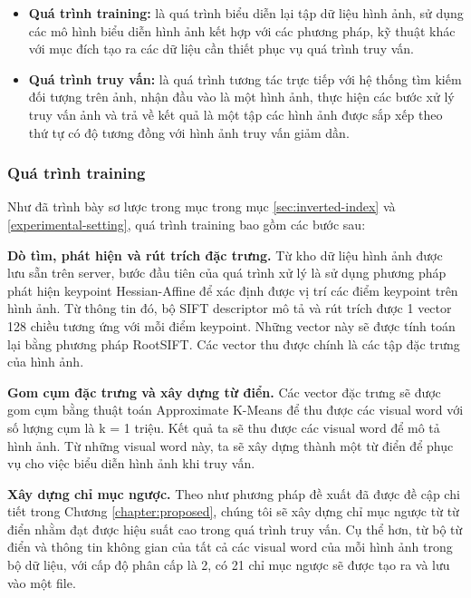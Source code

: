 \begin{itemize}
\item \textbf{Quá trình training:} là quá trình biểu diễn lại tập dữ liệu hình ảnh, sử dụng các mô hình biểu diễn hình ảnh kết hợp với các phương pháp, kỹ thuật khác với mục đích tạo ra các dữ liệu cần thiết phục vụ quá trình truy vấn.

\item \textbf{Quá trình truy vấn:} là quá trình tương tác trực tiếp với hệ thống tìm kiếm đối tượng trên ảnh, nhận đầu vào là một hình ảnh, thực hiện các bước xử lý truy vấn ảnh và trả về kết quả là một tập các hình ảnh được sắp xếp theo thứ tự có độ tương đồng với hình ảnh truy vấn giảm dần.
\end{itemize}

\subsubsection{Quá trình training}
Như đã trình bày sơ lược trong mục trong mục \ref{sec:inverted-index} và \ref{experimental-setting}, quá trình training bao gồm các bước sau:

\textbf{Dò tìm, phát hiện và rút trích đặc trưng.} Từ kho dữ liệu hình ảnh được lưu sẵn trên server, bước đầu tiên của quá trình xử lý là sử dụng phương pháp phát hiện keypoint Hessian-Affine để xác định được vị trí các điểm keypoint trên hình ảnh. Từ thông tin đó, bộ SIFT descriptor mô tả và rút trích được 1 vector 128 chiều tương ứng với mỗi điểm keypoint. Những vector này sẽ được tính toán lại bằng phương pháp RootSIFT\cite{philbin2007object}. Các vector thu được chính là các tập đặc trưng của hình ảnh. 

\textbf{Gom cụm đặc trưng và xây dựng từ điển.} Các vector đặc trưng sẽ được gom cụm bằng thuật toán Approximate K-Means\cite{philbin2007object} để thu được các visual word với số lượng cụm là k = 1 triệu. Kết quả ta sẽ thu được các visual word để mô tả hình ảnh. Từ những visual word này, ta sẽ xây dựng thành một từ điển để phục vụ cho việc biểu diễn hình ảnh khi truy vấn.

\textbf{Xây dựng chỉ mục ngược.} Theo như phương pháp đề xuất đã được đề cập chi tiết trong Chương \ref{chapter:proposed}, chúng tôi sẽ xây dựng chỉ mục ngược từ từ điển nhằm đạt được hiệu suất cao trong quá trình truy vấn. Cụ thể hơn, từ bộ từ điển và thông tin không gian của tất cả các visual word của mỗi hình ảnh trong bộ dữ liệu, với cấp độ phân cấp là 2, có 21 chỉ mục ngược sẽ được tạo ra và lưu vào một file.


